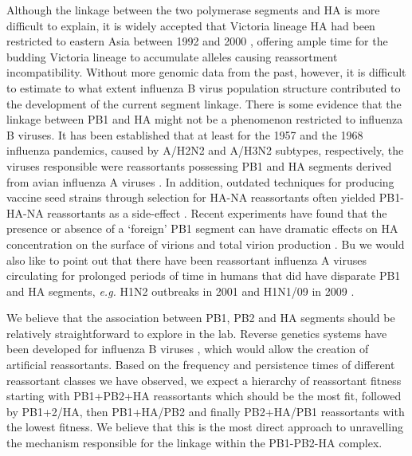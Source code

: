\documentclass[11pt,oneside,letterpaper]{article}
\begin{document}
Although the linkage between the two polymerase segments and HA is more difficult to explain, it is widely accepted that Victoria lineage HA had been restricted to eastern Asia between 1992 and 2000 \citep{nerome1998,shaw2002}, offering ample time for the budding Victoria lineage to accumulate alleles causing reassortment incompatibility.
Without more genomic data from the past, however, it is difficult to estimate to what extent influenza B virus population structure contributed to the development of the current segment linkage.
There is some evidence that the linkage between PB1 and HA might not be a phenomenon restricted to influenza B viruses.
It has been established that at least for the 1957 and the 1968 influenza pandemics, caused by A/H2N2 and A/H3N2 subtypes, respectively, the viruses responsible were reassortants possessing PB1 and HA segments derived from avian influenza A viruses \citep{kawaoka1989}.
In addition, outdated techniques for producing vaccine seed strains through selection for HA-NA reassortants often yielded PB1-HA-NA reassortants as a side-effect \citep{bergeron2010,fulvini2011}.
Recent experiments have found that the presence or absence of a `foreign' PB1 segment can have dramatic effects on HA concentration on the surface of virions and total virion production \citep{cobbin2013}.
Bu we would also like to point out that there have been reassortant influenza A viruses circulating for prolonged periods of time in humans that did have disparate PB1 and HA segments, \textit{e.g.} H1N2 outbreaks in 2001 \citep{gregory2002} and H1N1/09 in 2009 \citep{smith2009}.

We believe that the association between PB1, PB2 and HA segments should be relatively straightforward to explore in the lab.
Reverse genetics systems have been developed for influenza B viruses \citep{hoffmann2002}, which would allow the creation of artificial reassortants.
Based on the frequency and persistence times of different reassortant classes we have observed, we expect a hierarchy of reassortant fitness starting with PB1+PB2+HA reassortants which should be the most fit, followed by PB1+2/HA, then PB1+HA/PB2 and finally PB2+HA/PB1 reassortants with the lowest fitness.
We believe that this is the most direct approach to unravelling the mechanism responsible for the linkage within the PB1-PB2-HA complex.
\end{document}
